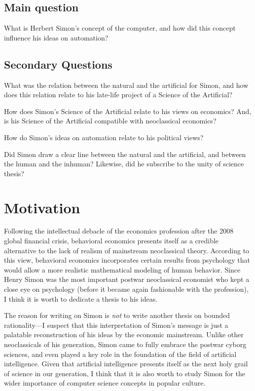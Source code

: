 \documentclass[draft=false, paper=A4,portrait,twoside=true,twocolumn=false,headinclude=false,footinclude=false,fontsize=11,BCOR=15mm,DIV=calc,pagesize=auto,titlepage=firstiscover,mpinclude=true,headings=big,headings=twolinechapter,open=right,chapterprefix=false,headsepline=false,parskip=full]{scrbook}
\begin{document}
\subsection{Main question}
\label{sec:org3587960}
What is Herbert Simon's concept of the computer, and how did this
concept influence his ideas on automation? 
\subsection{Secondary Questions}
\label{sec:org8b80b80}
What was the relation between the natural and the artificial for Simon, and
how does this relation relate to his late-life project of a Science of
the Artificial?

How does Simon's Science of the Artificial relate to his views on
economics? And, is his Science of the Artificial compatible with
neoclassical economics? 

How do Simon's ideas on automation relate to his political views?

Did Simon draw a clear line between the natural and the artificial, and between
the human and the inhuman? Likewise, did he subscribe to the unity of
science thesis?
\section{Motivation}
\label{sec:org29f4134}
Following the intellectual debacle of the economics profession after the
2008 global financial crisis, behavioral economics presents itself as a
credible alternative to the lack of realism of mainstream neoclassical
theory. According to this view, behavioral economics incorporates certain
results from psychology that would allow a more realistic mathematical
modeling of human behavior. Since Henry Simon was the most important
postwar neoclassical economist who kept a close eye on psychology (before
it became again fashionable with the profession), I think it is worth to
dedicate a thesis to his ideas. 

The reason for writing on Simon is \emph{not} to write another thesis on bounded
rationality---I suspect that this interpretation of Simon's message is just
a palatable reconstruction of his ideas by the economic mainstream. Unlike
other neoclassicals of his generation, Simon came to fully embrace the
postwar cyborg sciences, and even played a key role in the foundation of
the field of artificial intelligence. Given that artificial intelligence
presents itself as the next holy grail of science in our generation, I
think that it is also worth to study Simon for the wider importance of
computer science concepts in popular culture.
\end{document}
